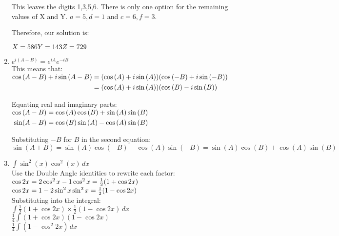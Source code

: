 \documentclass[../main.tex]{subfiles}
\begin{document}
\begin{enumerate}[itemsep=1cm]
    This leaves the digits 1,3,5,6. There is only one option for the remaining values of X and Y. $a=5, d=1$ and $c=6, f=3$.

    Therefore, our solution is:

    $X=586\\
    Y=143\\
    Z=729$

    \item
    \(e^{i(A-B)}=e^{iA}e^{-iB}\)\\
    This means that:\\
    $
    \!
    \begin{aligned}[t]
    \cos{(A-B)+i\sin{(A-B)}}
    &=(\cos{(A)+i\sin{(A)}})(\cos{(-B)+i\sin{(-B)}})\\
    &=(\cos{(A)+i\sin{(A)}})(\cos{(B)-i\sin{(B)}})
    \end{aligned}\\
    $
    
    Equating real and imaginary parts:\\
    $
    \!
    \begin{aligned}[t]
    \cos{(A-B)}
    &=\cos{(A)}\cos{(B)}+\sin{(A)}\sin{(B)}\\
    \sin(A-B)
    &=\cos{(B)}\sin{(A)}-\cos{(A)}\sin{(B)}\\
    \end{aligned}\\
    $

    Substituting \(-B\) for \(B\) in the second equation:\\
    \(\sin{(A+B)}=\sin{(A)}\cos{(-B)}-\cos{(A)}\sin{(-B)}=\sin{(A)}\cos{(B)}+\cos{(A)}\sin{(B)}\)\\

    \item 
    \(\int \sin^2{(x)}\cos^2{(x)} \,dx\)\\
    Use the Double Angle identities to rewrite each factor:\\
    \(\cos{2x}=2\cos^2{x}-1\\
    \cos^2{x}=\frac{1}{2}(1+\cos{2x})\)\\
    \(\cos{2x}=1-2\sin^2{x}\\
    \sin^2{x}=\frac{1}{2}(1-\cos{2x})\)\\

    Substituting into the integral:\\
    \(\int \frac{1}{2}(1+\cos{2x}) \times \frac{1}{2}(1-\cos{2x}) \,dx\)\\
    \(\frac{1}{4}\int (1+\cos{2x})(1-\cos{2x}) \,\)\\
    \(\frac{1}{4}\int (1-\cos^2{2x}) \,dx\)\\


\end{enumerate}
\end{document}
